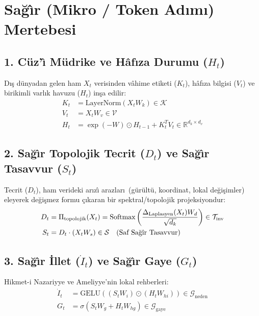 \documentclass[11pt,a4paper]{article}
\begin{document}
\section{Sa\u{g}\^{\i}r (Mikro / Token Ad\i m\i) Mertebesi}

\subsection{1. C\"uz'\^{\i} M\"udrike ve H\^{a}f\i za Durumu ($H_t$)}
D\i\c{s} d\"unyadan gelen ham $X_t$ verisinden v\^{a}hime etiketi ($K_t$), h\^{a}f\i za bilgisi ($V_t$) ve birikimli varl\i k havuzu ($H_t$) in\c{s}a edilir:
\begin{align}
K_t &= \text{LayerNorm}(X_t W_k) \in \mathcal{K} \\
V_t &= X_t W_v \in \mathcal{V} \\
H_t &= \exp(-W) \odot H_{t-1} + K_t^T V_t \in \mathbb{R}^{d_k \times d_v}
\end{align}

\subsection{2. Sa\u{g}\^{\i}r Topolojik Tecrit ($D_t$) ve Sa\u{g}\^{\i}r Tasavvur ($S_t$)}
Tecrit ($D_t$), ham verideki ar\i z\^{\i} arazlar\i\ (g\"ur\"ult\"u, koordinat, lokal de\u{g}i\c{s}imler) eleyerek de\u{g}i\c{s}mez formu \c{c}\i karan bir spektral/topolojik projeksiyondur:
\begin{align}
D_t &= \Pi_{\text{topolojik}}(X_t) = \text{Softmax}\left(\frac{\Delta_{\text{Laplasyen}}(X_t) W_d}{\sqrt{d_k}}\right) \in \mathcal{T}_{\text{inv}} \\
S_t &= D_t \cdot (X_t W_s) \in \mathcal{S} \quad \text{(Saf Sa\u{g}\^{\i}r Tasavvur)}
\end{align}

\subsection{3. Sa\u{g}\^{\i}r \.Illet ($\dot{I}_t$) ve Sa\u{g}\^{\i}r Gaye ($G_t$)}
Hikmet-i Nazariyye ve Ameliyye'nin lokal rehberleri:
\begin{align}
\dot{I}_t &= \text{GELU}\left((S_t W_i) \odot (H_t W_{hi})\right) \in \mathcal{G}_{\text{neden}} \\
G_t &= \sigma\left(S_t W_g + H_t W_{hg}\right) \in \mathcal{G}_{\text{gaye}}
\end{align}
\end{document}
